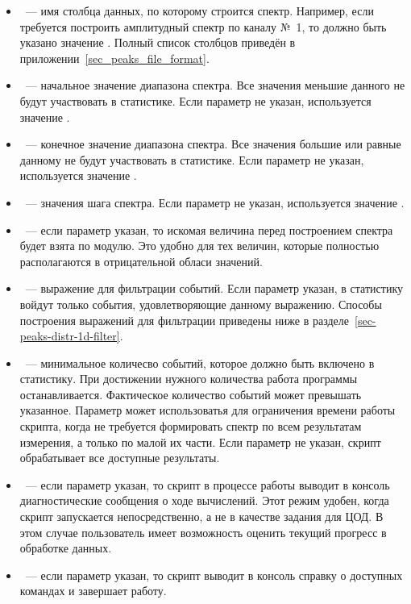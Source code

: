 \begin{itemize}

\item {}~--- имя столбца данных, по которому строится спектр. Например, если требуется построить амплитудный спектр по каналу №~1, то должно быть указано значение . Полный список столбцов приведён в приложении~\ref{sec_peaks_file_format}.

\item {}~--- начальное значение диапазона спектра. Все значения меньшие данного не будут участвовать в статистике. Если параметр не указан, используется значение .

\item {}~--- конечное значение диапазона спектра. Все значения большие или равные данному не будут участвовать в статистике. Если параметр не указан, используется значение .

\item {}~--- значения шага спектра. Если параметр не указан, используется значение .

\item {}~--- если параметр указан, то искомая величина перед построением спектра будет взята по модулю. Это удобно для тех величин, которые полностью располагаются в отрицательной обласи значений.

\item {}~--- выражение для фильтрации событий. Если параметр указан, в статистику войдут только события, удовлетворяющие данному выражению. Способы построения выражений для фильтрации приведены ниже в разделе~\ref{sec-peaks-distr-1d-filter}.

\item {}~--- минимальное количесво событий, которое должно быть включено в статистику. При достижении нужного количества работа программы останавливается. Фактическое количество событий может превышать указанное. Параметр может использоватья для ограничения времени работы скрипта, когда не требуется формировать спектр по всем результатам измерения, а только по малой их части. Если параметр не указан, скрипт обрабатывает все доступные результаты.

\item {}~--- если параметр указан, то скрипт в процессе работы выводит в консоль диагностические сообщения о ходе вычислений. Этот режим удобен, когда скрипт запускается непосредственно, а не в качестве задания для ЦОД. В этом случае пользователь имеет возможность оценить текущий прогресс в обработке данных.

\item {}~--- если параметр указан, то скрипт выводит в консоль справку о доступных командах и завершает работу.

\end{itemize}

